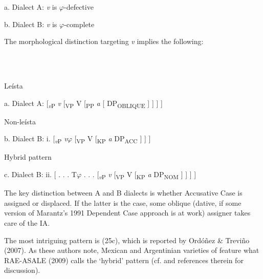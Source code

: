 \documentclass[output=paper]{langsci/langscibook}
\begin{document}
          a.   Dialect A: \textit{v} is $\varphi ${}-defective   

b.   Dialect B: \textit{v} is $\varphi ${}-complete 

The morphological distinction targeting \textit{v} implies the following:

\ea%
    \label{ex:key:25}
    \gll\\
        \\
    \glt
    \z

          Leísta 

a.   Dialect A:   [\textit{\textsubscript{v}}\textsubscript{P} \textit{v} [\textsubscript{VP} V  [\textsubscript{PP} \textit{a}   [ DP\textsubscript{OBLIQUE} ] ] ] ]      

 

Non-leísta 

b.  Dialect B:  i.  [\textit{\textsubscript{v}}\textsubscript{P} \textit{v}$\varphi $ [\textsubscript{VP} V [\textsubscript{KP} \textit{a} DP\textsubscript{ACC} ] ] ]

 

Hybrid pattern

  c.  Dialect B:  ii.   [ . . . T$\varphi $ . . . [\textit{\textsubscript{v}}\textsubscript{P} \textit{v} [\textsubscript{VP} V [\textsubscript{KP} \textit{a} DP\textsubscript{NOM} ] ] ] ]

 

The key distinction between A and B dialects is whether Accusative Case is assigned or displaced. If the latter is the case, some oblique (dative, if some version of Marantz’s 1991 Dependent Case approach is at work) assigner takes care of the IA.

The most intriguing pattern is (25c), which is reported by Ordóñez \& Treviño (2007). As these authors note, Mexican and Argentinian varieties of  feature what RAE-ASALE (2009) calls the ‘hybrid’ pattern (cf. \citealt{Planells2017} and references therein for discussion).

\ea%
    \label{ex:key:26}
    \gll\\
        \\
    \glt
    \z
\end{document}
